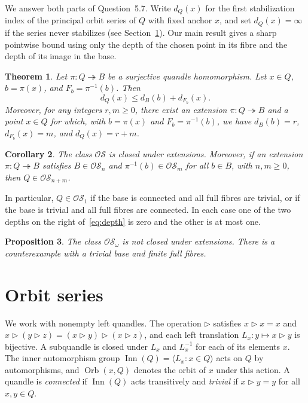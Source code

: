 \documentclass[11pt,a4paper]{article}
\newtheorem{theorem}{Theorem}[section]
\newtheorem{proposition}[theorem]{Proposition}
\newtheorem{corollary}[theorem]{Corollary}
\theoremstyle{remark}
\newcommand{\OS}{\mathcal{OS}}
\newcommand{\Inn}{\operatorname{Inn}}
\newcommand{\Orb}{\operatorname{Orb}}
\newcommand{\conj}{\triangleright}
\begin{document}
We answer both parts of Question~5.7. Write \(d_Q(x)\) for the first
stabilization index of the principal orbit series of \(Q\) with fixed
anchor \(x\), and set \(d_Q(x)=\infty\) if the series never stabilizes
(see Section~\ref{sec:prelim}). Our main result gives a sharp pointwise
bound using only the depth of the chosen point in its fibre and the
depth of its image in the base.

\begin{samepage}
\begin{theorem}\label{thm:main}
Let \(\pi\colon Q\twoheadrightarrow B\) be a surjective quandle
homomorphism. Let \(x\in Q\), \(b=\pi(x)\), and \(F_b=\pi^{-1}(b)\).
Then
\begin{equation}\label{eq:depth}
  d_Q(x)\le d_B(b)+d_{F_b}(x).
\end{equation}
Moreover, for any integers \(r,m\ge 0\), there exist an extension
\(\pi\colon Q\twoheadrightarrow B\) and a point \(x\in Q\) for which,
with \(b=\pi(x)\) and \(F_b=\pi^{-1}(b)\), we have
\(d_B(b)=r\), \(d_{F_b}(x)=m\), and \(d_Q(x)=r+m\).
\end{theorem}
\end{samepage}

\begin{corollary}\label{cor:closure}
The class \(\OS\) is closed under extensions. Moreover, if an extension
\(\pi\colon Q\twoheadrightarrow B\) satisfies \(B\in\OS_n\) and
\(\pi^{-1}(b)\in\OS_m\) for all \(b\in B\), with \(n,m\ge 0\), then
\(Q\in\OS_{n+m}\).
\end{corollary}

In particular, \(Q\in\OS_1\) if the base is connected and all full fibres
are trivial, or if the base is trivial and all full fibres are connected.
In each case one of the two depths on the right of~\eqref{eq:depth} is
zero and the other is at most one.

\begin{proposition}\label{prop:negative}
The class \(\OS_\omega\) is not closed under extensions. There is a
counterexample with a trivial base and finite full fibres.
\end{proposition}

\section{Orbit series}\label{sec:prelim}

We work with nonempty left quandles. The operation \(\conj\) satisfies
\(x\conj x=x\) and
\(x\conj(y\conj z)=(x\conj y)\conj(x\conj z)\), and each left translation
\(L_x\colon y\mapsto x\conj y\) is bijective. A subquandle is closed
under \(L_x\) and \(L_x^{-1}\) for each of its elements \(x\).
The inner automorphism group \(\Inn(Q)=\langle L_x : x\in Q\rangle\)
acts on \(Q\) by automorphisms, and \(\Orb(x,Q)\) denotes the orbit
of \(x\) under this action. A quandle is \emph{connected} if
\(\Inn(Q)\) acts transitively and \emph{trivial} if \(x\conj y=y\)
for all \(x,y\in Q\).
\end{document}
